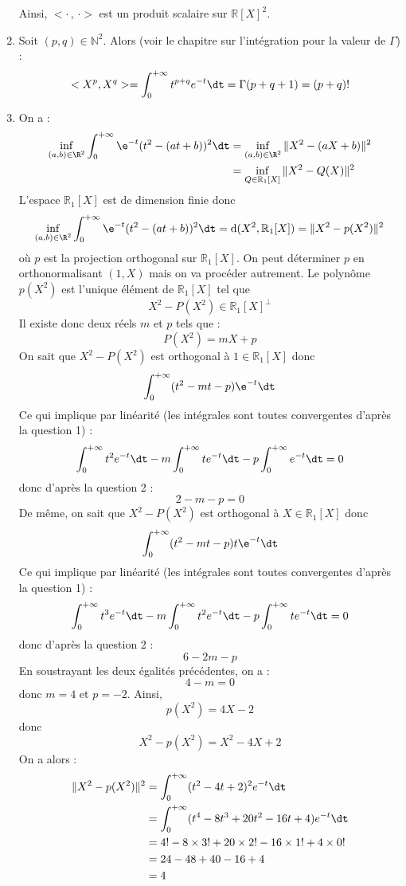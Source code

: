 \documentclass[a4paper,10pt]{report}
\begin{document}
\begin{enumerate}
\noindent Ainsi, $< \cdot \, , \, \cdot>$ est un produit scalaire sur $\mathbb{R}[X]^2$.
\item Soit $(p,q) \in \mathbb{N}^2$. Alors (voir le chapitre sur l'intégration pour la valeur de $\Gamma$) :
$$<X^p,X^q> = \int_0^{+ \infty} t^{p+q} e^{-t} \dt = \Gamma(p+q+1) = (p+q)!$$
\item  On a :
\begin{align*}
    \inf_{(a,b) \in \R^{2}} \int_{0}^{ + \infty} \e^{ - t}(t^{2} - (at + b))^{2} \dt&  =   \inf_{(a,b) \in \R^{2}} \Vert X^2-(aX+b)\Vert^2\\
    &  =   \inf_{Q \in \mathbb{R}_1[X]} \Vert X^2-Q(X) \Vert^2 
 \end{align*}
 L'espace $\mathbb{R}_1[X]$ est de dimension finie donc 
 $$  \inf_{(a,b) \in \R^{2}} \int_{0}^{ + \infty} \e^{ - t}(t^{2} - (at + b))^{2} \dt = \textrm{d}(X^2, \mathbb{R}_1[X]) = \Vert X^2-p(X^2) \Vert^2$$
 où $p$ est la projection orthogonal sur $\mathbb{R}_1[X]$. On peut déterminer $p$ en orthonormalisant $(1,X)$ mais on va procéder autrement. Le polynôme $p(X^2)$ est l'unique élément de $\mathbb{R}_1[X]$ tel que 
 $$ X^2-P(X^2) \in \mathbb{R}_1[X]^{\perp}$$
 Il existe donc deux réels $m$ et $p$ tels que :
 $$ P(X^2) = mX+p$$
 On sait que $X^2-P(X^2)$ est orthogonal à $1 \in \mathbb{R}_1[X]$ donc 
 $$ \int_{0}^{ + \infty} (t^2-mt-p) \e^{ - t} \dt$$
 Ce qui implique par linéarité (les intégrales sont toutes convergentes d'après la question 1) :
 $$ \int_{0}^{ + \infty}  t^2 e^{-t} \dt - m \int_{0}^{ + \infty}  t e^{-t} \dt -p \int_{0}^{ + \infty}   e^{-t} \dt =0$$
 donc d'après la question 2 :
 $$ 2-m-p=0$$
 De même, on sait que $X^2-P(X^2)$ est orthogonal à $X \in \mathbb{R}_1[X]$ donc 
 $$ \int_{0}^{ + \infty} (t^2-mt-p)t \e^{ - t} \dt$$
 Ce qui implique par linéarité (les intégrales sont toutes convergentes d'après la question 1) :
 $$ \int_{0}^{ + \infty}  t^3 e^{-t} \dt - m \int_{0}^{ + \infty}  t^2 e^{-t} \dt -p \int_{0}^{ + \infty}  t e^{-t} \dt =0$$
 donc d'après la question 2 :
 $$ 6-2m-p$$
 En soustrayant les deux égalités précédentes, on a :
 $$ 4-m=0$$
 donc $m=4$ et $p=-2$. Ainsi,
 $$ p(X^2) = 4X-2$$
 donc
 $$ X^2-p(X^2) = X^2-4X+2$$
 On a alors :
 \begin{align*}
 \Vert X^2-p(X^2) \Vert^2 & = \int_0^{+ \infty} (t^2-4t+2)^2 e^{-t} \dt \\
 & =  \int_0^{+ \infty} (t^4-8t^3+20t^2-16t+4) e^{-t} \dt \\
 & = 4!-8 \times 3!+20 \times 2!-16 \times 1! + 4 \times 0! \\
 & = 24 - 48+40-16+4 \\
 & = 4
 \end{align*}
\end{enumerate}
\end{document}
